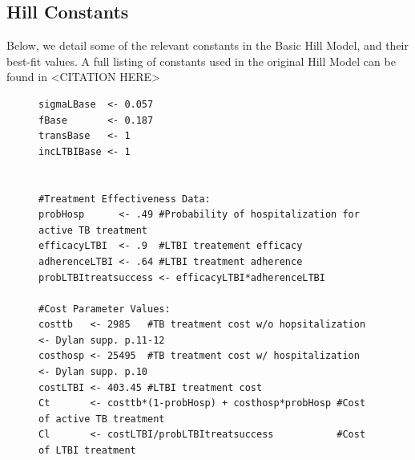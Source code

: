 \documentclass{amsart}
\begin{document}
\subsection{Hill Constants}
Below, we detail some of the relevant constants in the Basic Hill Model, and their best-fit
values. A full listing of constants used in the original Hill Model can be found in <CITATION HERE> 
\begin{figure}[h]
  \begin{center}
    \tiny{
    \begin{verbatim}
sigmaLBase  <- 0.057
fBase       <- 0.187
transBase   <- 1
incLTBIBase <- 1


#Treatment Effectiveness Data:
probHosp      <- .49 #Probability of hospitalization for active TB treatment
efficacyLTBI  <- .9  #LTBI treatement efficacy
adherenceLTBI <- .64 #LTBI treatment adherence
probLTBItreatsuccess <- efficacyLTBI*adherenceLTBI 

#Cost Parameter Values: 
costtb   <- 2985   #TB treatment cost w/o hopsitalization <- Dylan supp. p.11-12
costhosp <- 25495  #TB treatment cost w/ hospitalization  <- Dylan supp. p.10
costLTBI <- 403.45 #LTBI treatment cost
Ct       <- costtb*(1-probHosp) + costhosp*probHosp #Cost of active TB treatment
Cl       <- costLTBI/probLTBItreatsuccess           #Cost of LTBI treatment


\end{verbatim}}
\end{center}
\end{figure}
\end{document}
